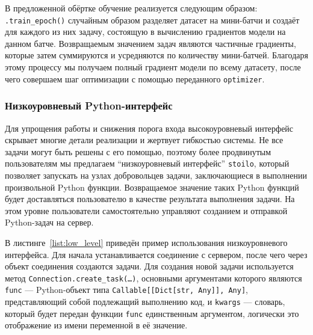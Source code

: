 \documentclass[a4paper,12pt]{extarticle}
\begin{document}
В предложенной обёртке обучение реализуется следующим образом: \texttt{.train\_epoch()} случайным образом разделяет датасет на мини-батчи и создаёт для каждого из них задачу, состоящую в вычислению градиентов модели на данном батче. Возвращаемым значением задач являются частичные градиенты, которые затем суммируются и усредняются по количеству мини-батчей. Благодаря этому процессу мы получаем полный градиент модели по всему датасету, после чего совершаем шаг оптимизации с помощью переданного \texttt{optimizer}.


\subsubsection{Низкоуровневый Python-интерфейс}

Для упрощения работы и снижения порога входа высокоуровневый интерфейс скрывает многие детали реализации и жертвует гибкостью системы.
Не все задачи могут быть решены с его помощью, поэтому более продвинутым пользователям мы предлагаем ``низкоуровневый интерфейс'' \texttt{stoilo}, который позволяет запускать на узлах добровольцев задачи, заключающиеся в выполнении произвольной Python функции. Возвращаемое значение таких Python функций будет доставляться пользователю в качестве результата выполнения задачи. На этом уровне пользователи самостоятельно управляют созданием и отправкой Python-задач на сервер.

В листинге~\ref{list:low_level} приведён пример использования низкоуровневого интерфейса. Для начала устанавливается соединение с сервером, после чего через объект соединения создаются задачи.
Для создания новой задачи используется метод \texttt{Connection.create\_task(\ldots)}, основными аргументами которого являются \texttt{func} — Python-объект типа \texttt{Callable[[Dict[str, Any]], Any]}, представляющий собой подлежащий выполнению код, и \texttt{kwargs} — словарь, который будет передан функции \texttt{func} единственным аргументом, логически это отображение из имени переменной в её значение.
\end{document}
